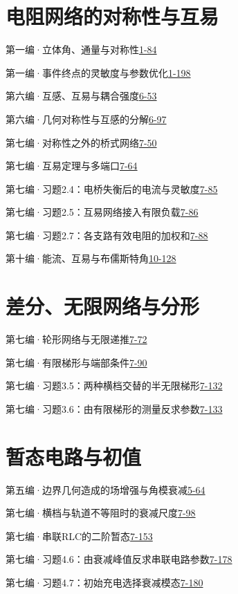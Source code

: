 \section*{电阻网络的对称性与互易}
\noindent 第一编·立体角、通量与对称性\quad\href{course-page:1:89}{1-84}\par
\noindent 第一编·事件终点的灵敏度与参数优化\quad\href{course-page:1:203}{1-198}\par
\noindent 第六编·互感、互易与耦合强度\quad\href{course-page:6:56}{6-53}\par
\noindent 第六编·几何对称性与互感的分解\quad\href{course-page:6:100}{6-97}\par
\noindent 第七编·对称性之外的桥式网络\quad\href{course-page:7:53}{7-50}\par
\noindent 第七编·互易定理与多端口\quad\href{course-page:7:67}{7-64}\par
\noindent 第七编·习题2.4：电桥失衡后的电流与灵敏度\quad\href{course-page:7:88}{7-85}\par
\noindent 第七编·习题2.5：互易网络接入有限负载\quad\href{course-page:7:89}{7-86}\par
\noindent 第七编·习题2.7：各支路有效电阻的加权和\quad\href{course-page:7:91}{7-88}\par
\noindent 第十编·能流、互易与布儒斯特角\quad\href{course-page:10:132}{10-128}\par
\section*{差分、无限网络与分形}
\noindent 第七编·轮形网络与无限递推\quad\href{course-page:7:75}{7-72}\par
\noindent 第七编·有限梯形与端部条件\quad\href{course-page:7:93}{7-90}\par
\noindent 第七编·习题3.5：两种横档交替的半无限梯形\quad\href{course-page:7:135}{7-132}\par
\noindent 第七编·习题3.6：由有限梯形的测量反求参数\quad\href{course-page:7:136}{7-133}\par
\section*{暂态电路与初值}
\noindent 第五编·边界几何造成的场增强与角模衰减\quad\href{course-page:5:66}{5-64}\par
\noindent 第七编·横档与轨道不等阻时的衰减尺度\quad\href{course-page:7:101}{7-98}\par
\noindent 第七编·串联RLC的二阶暂态\quad\href{course-page:7:156}{7-153}\par
\noindent 第七编·习题4.6：由衰减峰值反求串联电路参数\quad\href{course-page:7:181}{7-178}\par
\noindent 第七编·习题4.7：初始充电选择衰减模态\quad\href{course-page:7:183}{7-180}\par
